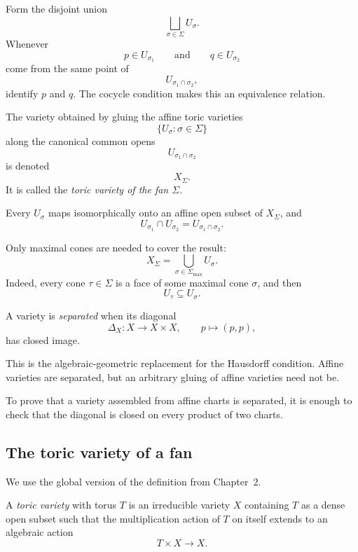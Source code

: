 Form the disjoint union
\[
\bigsqcup_{\sigma\in\Sigma}U_\sigma.
\]
Whenever
\[
p\in U_{\sigma_1}
\qquad\text{and}\qquad
q\in U_{\sigma_2}
\]
come from the same point of
\[
U_{\sigma_1\cap\sigma_2},
\]
identify \(p\) and \(q\). The cocycle condition makes this an
equivalence relation.

\begin{definition}
The variety obtained by gluing the affine toric varieties
\[
\{U_\sigma:\sigma\in\Sigma\}
\]
along the canonical common opens
\[
U_{\sigma_1\cap\sigma_2}
\]
is denoted
\[
X_\Sigma.
\]
It is called the \emph{toric variety of the fan \(\Sigma\)}.
\end{definition}

Every \(U_\sigma\) maps isomorphically onto an affine open subset of
\(X_\Sigma\), and
\[
U_{\sigma_1}\cap U_{\sigma_2}
=
U_{\sigma_1\cap\sigma_2}.
\]

Only maximal cones are needed to cover the result:
\[
X_\Sigma
=
\bigcup_{\sigma\in\Sigma_{\max}}U_\sigma.
\]
Indeed, every cone \(\tau\in\Sigma\) is a face of some maximal cone
\(\sigma\), and then
\[
U_\tau\subseteq U_\sigma.
\]

\begin{agcheatsheet}
A variety is \emph{separated} when its diagonal
\[
\Delta_X:X\longrightarrow X\times X,
\qquad
p\longmapsto(p,p),
\]
has closed image.

This is the algebraic-geometric replacement for the Hausdorff
condition. Affine varieties are separated, but an arbitrary gluing of
affine varieties need not be.

To prove that a variety assembled from affine charts is separated, it
is enough to check that the diagonal is closed on every product of two
charts.
\end{agcheatsheet}

\subsection{The toric variety of a fan}

We use the global version of the definition from Chapter~2.

\begin{definition}
A \emph{toric variety} with torus \(T\) is an irreducible variety
\(X\) containing \(T\) as a dense open subset such that the
multiplication action of \(T\) on itself extends to an algebraic
action
\[
T\times X\longrightarrow X.
\]
\end{definition}

